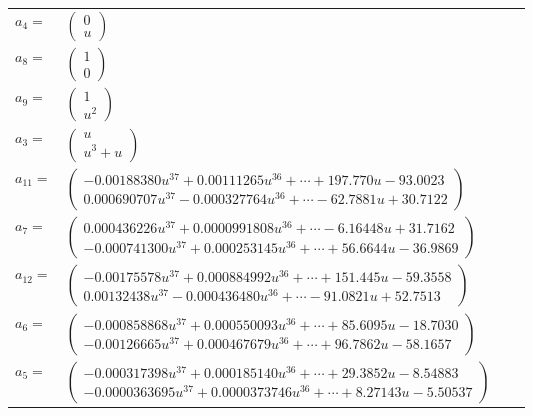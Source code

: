 \documentclass[1p]{elsarticle_modified}
\theoremstyle{definition}
\begin{document}
\begin{tabular}{m{7pt} m{180pt} m{7pt} m{180pt} }
\flushright $a_{4}=$&$\begin{pmatrix}0\\u\end{pmatrix}$ \\
\flushright $a_{8}=$&$\begin{pmatrix}1\\0\end{pmatrix}$ \\
\flushright $a_{9}=$&$\begin{pmatrix}1\\u^2\end{pmatrix}$ \\
\flushright $a_{3}=$&$\begin{pmatrix}u\\u^3+u\end{pmatrix}$ \\
\flushright $a_{11}=$&$\begin{pmatrix}-0.00188380 u^{37}+0.00111265 u^{36}+\cdots+197.770 u-93.0023\\0.000690707 u^{37}-0.000327764 u^{36}+\cdots-62.7881 u+30.7122\end{pmatrix}$ \\
\flushright $a_{7}=$&$\begin{pmatrix}0.000436226 u^{37}+0.0000991808 u^{36}+\cdots-6.16448 u+31.7162\\-0.000741300 u^{37}+0.000253145 u^{36}+\cdots+56.6644 u-36.9869\end{pmatrix}$ \\
\flushright $a_{12}=$&$\begin{pmatrix}-0.00175578 u^{37}+0.000884992 u^{36}+\cdots+151.445 u-59.3558\\0.00132438 u^{37}-0.000436480 u^{36}+\cdots-91.0821 u+52.7513\end{pmatrix}$ \\
\flushright $a_{6}=$&$\begin{pmatrix}-0.000858868 u^{37}+0.000550093 u^{36}+\cdots+85.6095 u-18.7030\\-0.00126665 u^{37}+0.000467679 u^{36}+\cdots+96.7862 u-58.1657\end{pmatrix}$ \\
\flushright $a_{5}=$&$\begin{pmatrix}-0.000317398 u^{37}+0.000185140 u^{36}+\cdots+29.3852 u-8.54883\\-0.0000363695 u^{37}+0.0000373746 u^{36}+\cdots+8.27143 u-5.50537\end{pmatrix}$ \\

\end{tabular}
\end{document}
